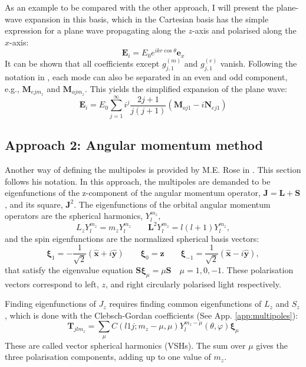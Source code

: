 As an example to be compared with the other approach, I will present the plane-wave expansion in this basis, which in the Cartesian basis has the simple expression for a plane wave propagating along the \( z \)-axis and polarised along the \( x \)-axis:
\begin{equation}\label{eq:PW_cart}
     \mathbf{E}_i = E_0 e^{ikr \cos\theta} \mathrm{\mathbf{e}}_x
\end{equation}
It can be shown that all coefficients except \( g^{(m)}_{j,1} \) and \( g^{(e)}_{j,1} \) vanish. Following the notation in \cite{bohren}, each mode can also be separated in an even and odd component, e.g., \( \mathbf{M}_{ejm_z} \) and \( \mathbf{M}_{ojm_z} \). This yields the simplified expansion of the plane wave:
\begin{equation}\label{eq:PW_sph}
    \mathbf{E}_i = E_0 \sum_{j=1}^\infty i^j \frac{2j+1}{j(j+1)} (\mathbf{M}_{oj1} - i \mathbf{N}_{ej1})
\end{equation}

\subsection{Approach 2: Angular momentum method}\label{2_rose}
Another way of defining the multipoles is provided by M.E. Rose in \cite{rose}. This section follows his notation. In this approach, the multipoles are demanded to be eigenfunctions of the z-component of the angular momentum operator, \( \mathbf{J} = \mathbf{L} + \mathbf{S} \), and its square, \( \mathbf{J}^2 \). The eigenfunctions of the orbital angular momentum operators are the spherical harmonics, \( Y_l^{m_z} \),
\begin{equation}\label{eq.sphharm}
    L_z Y_l^{m_z} = m_z Y_l^{m_z} \qquad \mathbf{L}^2 Y_l^{m_z} = l(l+1) Y_l^{m_z},
\end{equation}
and the spin eigenfunctions are the normalized spherical basis vectors:
\begin{equation}\label{eq:S_ev}
    \boldsymbol{\xi}_1 = -\frac{1}{\sqrt{2}} (\mathbf{\hat{x}} + i \mathbf{\hat{y}}) \qquad
    \boldsymbol{\xi}_0 = \mathbf{\hat{z}} \qquad
    \boldsymbol{\xi}_{-1} = \frac{1}{\sqrt{2}} (\mathbf{\hat{x}} - i \mathbf{\hat{y}}),
\end{equation}
that satisfy the eigenvalue equation \( \mathbf{S} \boldsymbol{\xi}_{\mu} = \mu \mathbf{S} \quad \mu = 1, 0, -1 \). These polarisation vectors correspond to left, \( z \), and right circularly polarised light respectively.

Finding eigenfunctions of \( J_z \) requires finding common eigenfunctions of \( L_z \) and \( S_z \), which is done with the Clebsch-Gordan coefficients (See App. \ref{app:multipoles}):
\begin{equation}
    \mathbf{T}_{jlm_z} = \sum_{\mu} C(l 1 j; m_z - \mu, \mu) Y_{l}^{m_z - \mu}(\theta, \varphi) \boldsymbol{\xi}_{\mu}
\end{equation}
These are called vector spherical harmonics (VSHs). The sum over \( \mu \) gives the three polarisation components, adding up to one value of \( m_z \).

